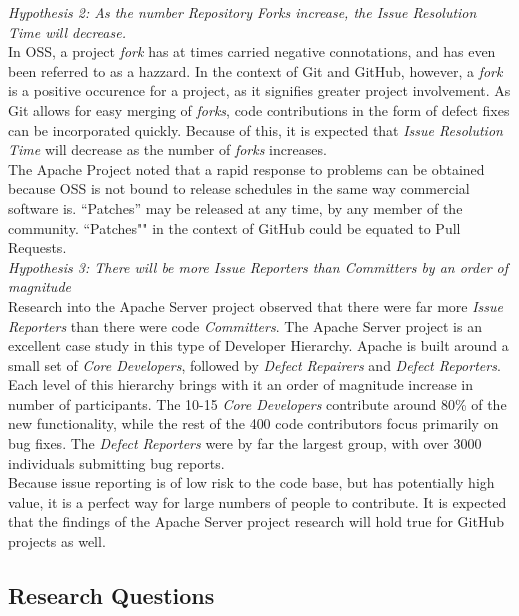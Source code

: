 \documentclass{proc}
\begin{document}
\emph{Hypothesis 2: As the number Repository Forks increase, the Issue Resolution Time will decrease.}\\
In OSS, a project \emph{fork} has at times carried negative connotations, and has even been referred to as a hazzard\cite{kogut2001open}. In the context of Git and GitHub, however, a \emph{fork} is a positive occurence for a project, as it signifies greater project involvement. As Git allows for easy merging of \emph{forks}, code contributions in the form of defect fixes can be incorporated quickly. Because of this, it is expected that \emph{Issue Resolution Time} will decrease as the number of \emph{forks} increases.\\

The Apache Project noted that a rapid response to problems can be obtained because OSS is not bound to release schedules in the same way commercial software is. ``Patches'' may be released at any time, by any member of the community\cite{mockus2000case}. ``Patches"" in the context of GitHub could be equated to Pull Requests.\\

\emph{Hypothesis 3: There will be more Issue Reporters than Committers by an order of magnitude}\\
Research into the Apache Server project observed that there were far more \emph{Issue Reporters} than there were code \emph{Committers}\cite{mockus2000case}. The Apache Server project is an excellent case study in this type of Developer Hierarchy. Apache is built around a small set of {\it Core Developers}, followed by {\it Defect Repairers} and {\it Defect Reporters}. Each level of this hierarchy brings with it an order of magnitude increase in number of participants. The 10-15 {\it Core Developers} contribute around 80\% of the new functionality, while the rest of the 400 code contributors focus primarily on bug fixes. The {\it Defect Reporters} were by far the largest group, with over 3000 individuals submitting bug reports.\\

Because issue reporting is of low risk to the code base, but has potentially high value, it is a perfect way for large numbers of people to contribute. It is expected that the findings of the Apache Server project research will hold true for GitHub projects as well.\\

\subsection{Research Questions}
\end{document}
